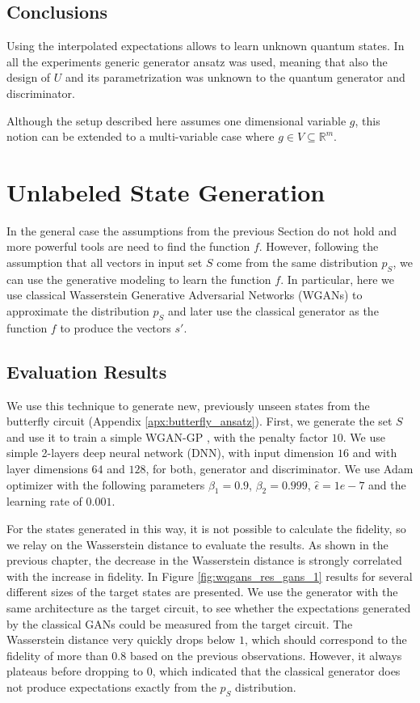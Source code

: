 \subsection{Conclusions}
Using the interpolated expectations allows to learn unknown quantum states.
In all the experiments generic generator ansatz was used, meaning that also the
design of $U$ and its parametrization was unknown to the quantum generator and
discriminator.

Although the setup described here assumes one dimensional variable $g$, this
notion can be extended to a multi-variable case where $g \in V \subseteq
\mathbb{R}^m$.



\section{Unlabeled State Generation}
In the general case the assumptions from the previous Section do not hold and
more powerful tools are need to find the function $f$. However, following the assumption
that all vectors in input set $S$ come from the same distribution $p_S$, we can use
the generative modeling to learn the function $f$. In particular, here we use
classical Wasserstein Generative Adversarial Networks (WGANs) to approximate the
distribution $p_S$ and later use the classical generator as the function $f$ to
produce the vectors $s'$. 

\subsection{Evaluation Results}
We use this technique to generate new, previously unseen states from the butterfly circuit
(Appendix \ref{apx:butterfly_ansatz}). First, we generate the set $S$ and use it
to train a simple WGAN-GP \cite{gulrajani2017improved}, with the penalty factor
$10$. We use simple 2-layers deep neural network (DNN), with input dimension $16$ and
with layer dimensions $64$ and $128$, for both, generator and
discriminator. We use Adam optimizer \cite{kingma2017adam} with the following
parameters $\beta_1 = 0.9$, $\beta_2 = 0.999$, $\hat{\epsilon} = 1e - 7$ and the
learning rate of $0.001$. 

For the states generated in this way, it is not possible to calculate the fidelity, so we
relay on the Wasserstein distance to evaluate the results. As shown in the previous
chapter, the decrease in the Wasserstein distance is strongly correlated with
the increase in fidelity. In Figure \ref{fig:wqgans_res_gans_1} results for
several different sizes of the target states are presented. We use the generator with the
same architecture as the target circuit, to see whether the expectations
generated by the classical GANs could be measured from the target circuit.
The Wasserstein distance very quickly drops below $1$, which should correspond to
the fidelity of more than $0.8$ based on the previous observations. However, it
always plateaus before dropping to 0, which indicated that the classical
generator does not produce expectations exactly from the $p_S$ distribution.

